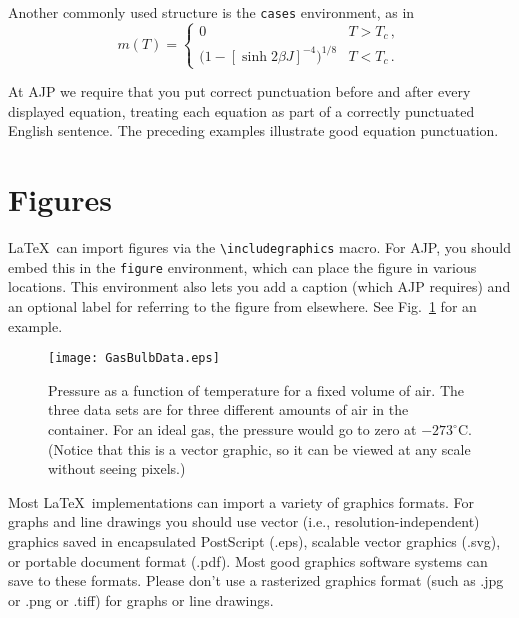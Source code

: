 \documentclass[prb,preprint]{revtex4-1}
\begin{document}
Another commonly used structure is the \texttt{cases} environment, as in
\begin{equation}
m(T) =
\begin{cases}
	0 & T > T_c \, , \\
	\bigl(1 - [\sinh 2 \beta J]^{-4} \bigr)^{1/8} & T < T_c \, .
\end{cases}
\end{equation}

At AJP we require that you put correct punctuation before and after every
displayed equation, treating each equation as part of a correctly punctuated
English sentence.\cite{mermin} The preceding examples illustrate good
equation punctuation.


\section{Figures}

\LaTeX\ can import figures via the \verb/\includegraphics/ macro.
For AJP, you should embed this in the \texttt{figure} environment, which 
can place the figure in various locations.  This environment also lets 
you add a caption (which AJP requires) and an optional label for referring 
to the figure from elsewhere.  See Fig.~\ref{gasbulbdata} for an example.

\begin{figure}[h!]
\centering
\texttt{[image: GasBulbData.eps]}
\caption{Pressure as a function of temperature for a fixed volume of air.  
The three data sets are for three different amounts of air in the container. 
For an ideal gas, the pressure would go to zero at $-273^\circ$C.  (Notice
that this is a vector graphic, so it can be viewed at any scale without
seeing pixels.)}
\label{gasbulbdata}
\end{figure}

Most \LaTeX\ implementations can import a variety of graphics formats.
For graphs and line drawings you should use vector (i.e., resolution-independent)
graphics saved in encapsulated PostScript (.eps), scalable vector graphics (.svg), 
or portable document format (.pdf).  Most good graphics software systems can 
save to these formats.  Please don't use a rasterized graphics format
(such as .jpg or .png or .tiff) for graphs or line drawings.
\end{document}
